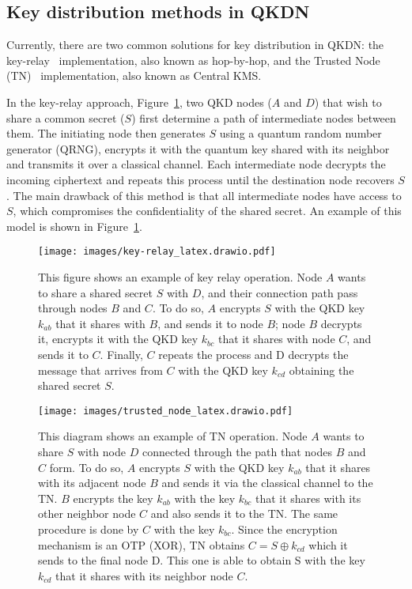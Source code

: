 \documentclass[conference]{IEEEtran}
\begin{document}
\subsection{Key distribution methods in QKDN \label{subsec:qkdn}}

Currently, there are two common solutions for key distribution in QKDN: the key-relay~\cite{elliott2002building} implementation, also known as hop-by-hop, and the Trusted Node (TN)~\cite{ITU-T_Y3803} implementation, also known as Central KMS.

In the key-relay approach, Figure~\ref{fig:key-relay}, two QKD nodes ($A$ and $D$) that wish to share a common secret ($S$) first determine a path of intermediate nodes between them. The initiating node then generates $S$ using a quantum random number generator (QRNG), encrypts it with the quantum key shared with its neighbor and transmits it over a classical channel. Each intermediate node decrypts the incoming ciphertext and repeats this process until the destination node recovers $S$. The main drawback of this method is that all intermediate nodes have access to $S$, which compromises the confidentiality of the shared secret. An example of this model is shown in Figure~\ref{fig:key-relay}.

\begin{figure}[t]
    \centering
    \texttt{[image: images/key-relay\_latex.drawio.pdf]}
    
    \caption{This figure shows an example of key relay operation. Node $A$ wants to share a shared secret $S$ with $D$, and their connection path pass through nodes $B$ and $C$. To do so, $A$ encrypts $S$ with the QKD key \(k_{ab}\) that it shares with $B$, and sends it to node $B$; node $B$ decrypts it, encrypts it with the QKD key \(k_{bc}\) that it shares with node $C$, and sends it to $C$. Finally, $C$ repeats the process and D decrypts the message that arrives from $C$ with the QKD key \(k_{cd}\) obtaining the shared secret $S$.
    \label{fig:key-relay}}
\end{figure}

\begin{figure}[t]
    \centering
    \texttt{[image: images/trusted\_node\_latex.drawio.pdf]}
    
    \caption{This diagram shows an example of TN operation. Node $A$ wants to share $S$ with node $D$ connected through the path that nodes $B$ and $C$ form. To do so, $A$ encrypts $S$ with the QKD key \(k_{ab}\) that it shares with its adjacent node $B$ and sends it via the classical channel to the TN. $B$ encrypts the key \(k_{ab}\) with the key \(k_{bc}\) that it shares with its other neighbor node $C$ and also sends it to the TN. The same procedure is done by $C$ with the key \(k_{bc}\). Since the encryption mechanism is an OTP (XOR), TN obtains $C = S \oplus k_{cd}$ which it sends to the final node D. This one is able to obtain S with the key $k_{cd}$ that it shares with its neighbor node $C$.
    \label{fig:tn}}
\end{figure}
\raggedbottom
\end{document}
